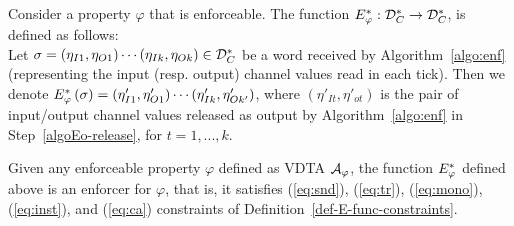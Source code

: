 \begin{definition}[$\efalgo$]
	\label{def-algo-ef}
	Consider a property $\varphi$ that is enforceable. 
	The function ${E_{\varphi}^*}:{\mathcal D}_C^*\to{\mathcal D}_C^*$,  is defined as follows:\\
	Let $\sigma = \left(\eta_{I1}, \eta_{O1}\right) \cdots \left(\eta_{Ik}, \eta_{Ok}\right)\in{\mathcal D}_C^*$ be a word received by
	Algorithm~\ref{algo:enf} (representing the input (resp. output) channel values read in each tick). Then we denote
	${E_{\varphi}^*}\left(\sigma\right)=\left(\eta'_{I1}, \eta'_{O1}\right) \cdots \left(\eta'_{Ik}, \eta'_{Ok'}\right)$, where $\left(\eta'_{It},\eta'_{ot}\right)$ is the
	pair of input/output channel values released as output by Algorithm~\ref{algo:enf} in Step~\ref{algoEo-release},
	for $t=1,...,k$.
\end{definition}

\begin{proposition}
	\label{prop-constraints-algo}
	Given any enforceable property $\varphi$ defined as VDTA ${\mathcal A}_\varphi$,
	the function $\efalgo$ defined above is an enforcer for $\varphi$, that is,
	it satisfies (\ref{eq:snd}), (\ref{eq:tr}), (\ref{eq:mono}), (\ref{eq:inst}), and (\ref{eq:ca}) constraints of Definition~\ref{def-E-func-constraints}.
\end{proposition}
